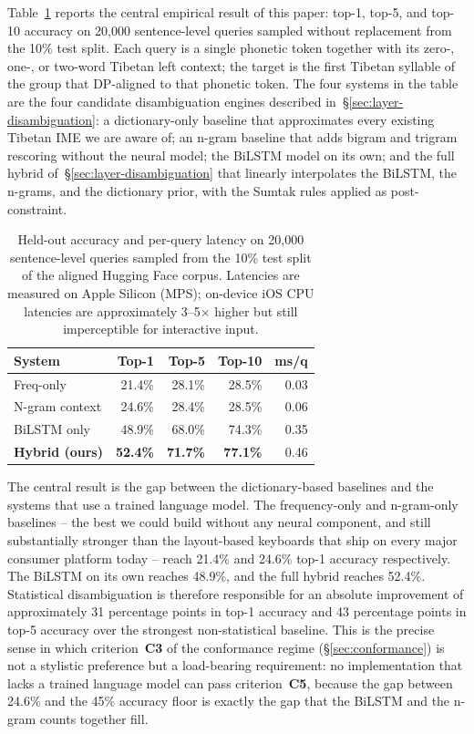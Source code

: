 \documentclass[11pt]{article}
\begin{document}
Table~\ref{tab:heldout} reports the central empirical result of this paper: top-1, top-5, and top-10 accuracy on 20{,}000 sentence-level queries sampled without replacement from the 10\% test split. Each query is a single phonetic token together with its zero-, one-, or two-word Tibetan left context; the target is the first Tibetan syllable of the group that DP-aligned to that phonetic token. The four systems in the table are the four candidate disambiguation engines described in~\S\ref{sec:layer-disambiguation}: a dictionary-only baseline that approximates every existing Tibetan IME we are aware of; an n-gram baseline that adds bigram and trigram rescoring without the neural model; the BiLSTM model on its own; and the full hybrid of~\S\ref{sec:layer-disambiguation} that linearly interpolates the BiLSTM, the n-grams, and the dictionary prior, with the Sumtak rules applied as post-constraint.

\begin{table}[t]
\centering
\small
\begin{tabular}{lrrrr}
\toprule
System & Top-1 & Top-5 & Top-10 & ms/q \\
\midrule
Freq-only                 & 21.4\% & 28.1\% & 28.5\% & 0.03 \\
N-gram context            & 24.6\% & 28.4\% & 28.5\% & 0.06 \\
BiLSTM only               & 48.9\% & 68.0\% & 74.3\% & 0.35 \\
\textbf{Hybrid (ours)}    & \textbf{52.4\%} & \textbf{71.7\%} & \textbf{77.1\%} & 0.46 \\
\bottomrule
\end{tabular}
\caption{Held-out accuracy and per-query latency on 20{,}000 sentence-level queries sampled from the 10\% test split of the aligned Hugging Face corpus. Latencies are measured on Apple Silicon (MPS); on-device iOS CPU latencies are approximately 3--5$\times$ higher but still imperceptible for interactive input.}
\label{tab:heldout}
\end{table}

The central result is the gap between the dictionary-based baselines and the systems that use a trained language model. The frequency-only and n-gram-only baselines -- the best we could build without any neural component, and still substantially stronger than the layout-based keyboards that ship on every major consumer platform today -- reach 21.4\% and 24.6\% top-1 accuracy respectively. The BiLSTM on its own reaches 48.9\%, and the full hybrid reaches 52.4\%. Statistical disambiguation is therefore responsible for an absolute improvement of approximately 31 percentage points in top-1 accuracy and 43 percentage points in top-5 accuracy over the strongest non-statistical baseline. This is the precise sense in which criterion~\textbf{C3} of the conformance regime (\S\ref{sec:conformance}) is not a stylistic preference but a load-bearing requirement: no implementation that lacks a trained language model can pass criterion~\textbf{C5}, because the gap between 24.6\% and the 45\% accuracy floor is exactly the gap that the BiLSTM and the n-gram counts together fill.
\end{document}
